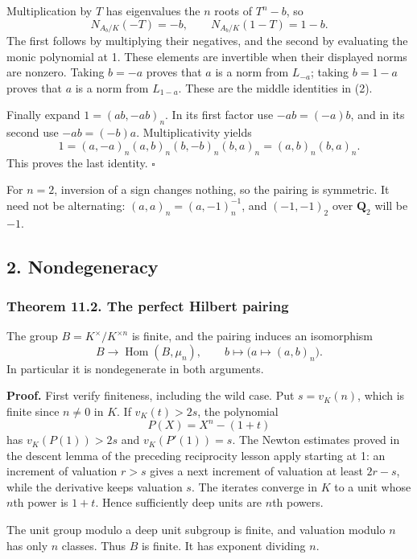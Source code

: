\documentclass[11pt,a4paper]{article}
\begin{document}
Multiplication by \(T\) has eigenvalues the \(n\) roots of \(T^n-b\), so
\[
N_{A_b/K}(-T)=-b,\qquad
N_{A_b/K}(1-T)=1-b.
\tag{3}
\] The first follows by multiplying their negatives, and the second by
evaluating the monic polynomial at 1. These elements are invertible when
their displayed norms are nonzero. Taking \(b=-a\) proves that \(a\) is
a norm from \(L_{-a}\); taking \(b=1-a\) proves that \(a\) is a norm
from \(L_{1-a}\). These are the middle identities in (2).

Finally expand \(1=(ab,-ab)_n\). In its first factor use \(-ab=(-a)b\),
and in its second use \(-ab=(-b)a\). Multiplicativity yields \[
1=(a,-a)_n(a,b)_n(b,-b)_n(b,a)_n
  =(a,b)_n(b,a)_n.
\] This proves the last identity. \(\square\)

For \(n=2\), inversion of a sign changes nothing, so the pairing is
symmetric. It need not be alternating: \((a,a)_n=(a,-1)_n^{-1}\), and
\((-1,-1)_2\) over \(\mathbf Q_2\) will be \(-1\).

\subsection{2. Nondegeneracy}\label{nondegeneracy}

\subsubsection{Theorem 11.2. The perfect Hilbert
pairing}\label{theorem-11.2.-the-perfect-hilbert-pairing}

The group \(B=K^\times/K^{\times n}\) is finite, and the pairing induces
an isomorphism \[
B\longrightarrow\operatorname{Hom}(B,\mu_n),\qquad
b\longmapsto\bigl(a\mapsto(a,b)_n\bigr).
\tag{4}
\] In particular it is nondegenerate in both arguments.

\textbf{Proof.} First verify finiteness, including the wild case. Put
\(s=v_K(n)\), which is finite since \(n\ne0\) in \(K\). If
\(v_K(t)>2s\), the polynomial \[
P(X)=X^n-(1+t)
\] has \(v_K(P(1))>2s\) and \(v_K(P'(1))=s\). The Newton estimates
proved in the descent lemma of the preceding reciprocity lesson apply
starting at 1: an increment of valuation \(r>s\) gives a next increment
of valuation at least \(2r-s\), while the derivative keeps valuation
\(s\). The iterates converge in \(K\) to a unit whose \(n\)th power is
\(1+t\). Hence sufficiently deep units are \(n\)th powers.

The unit group modulo a deep unit subgroup is finite, and valuation
modulo \(n\) has only \(n\) classes. Thus \(B\) is finite. It has
exponent dividing \(n\).
\end{document}
